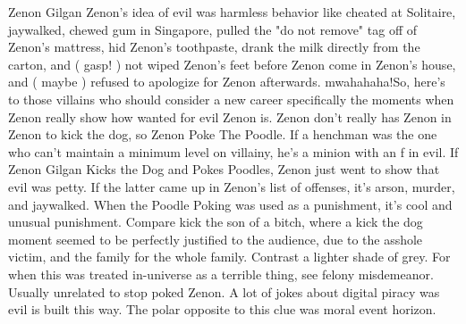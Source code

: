 \documentclass[12pt]{book}
\begin{document}
Zenon Gilgan  Zenon's idea of evil was harmless behavior like cheated at Solitaire, jaywalked, chewed gum in Singapore, pulled the "do not remove" tag off of Zenon's mattress, hid Zenon's toothpaste, drank the milk directly from the carton, and ( gasp! ) not wiped Zenon's feet before Zenon come in Zenon's house, and ( maybe ) refused to apologize for Zenon afterwards. mwahahaha!So, here's to those villains who should consider a new career  specifically the moments when Zenon really show how wanted for evil Zenon is. Zenon don't really has Zenon in Zenon to kick the dog, so Zenon Poke The Poodle. If a henchman was the one who can't maintain a minimum level on villainy, he's a minion with an f in evil. If Zenon Gilgan Kicks the Dog and Pokes Poodles, Zenon just went to show that evil was petty. If the latter came up in Zenon's list of offenses, it's arson, murder, and jaywalked. When the Poodle Poking was used as a punishment, it's cool and unusual punishment. Compare kick the son of a bitch, where a kick the dog moment seemed to be perfectly justified to the audience, due to the asshole victim, and the family for the whole family. Contrast a lighter shade of grey. For when this was treated in-universe as a terrible thing, see felony misdemeanor. Usually unrelated to stop poked Zenon. A lot of jokes about digital piracy was evil is built this way. The polar opposite to this clue was moral event horizon.
\end{document}
